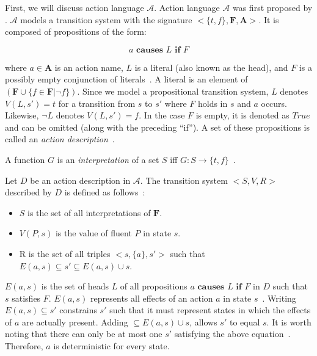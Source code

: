 First, we will discuss action language $ \mathcal{A} $.
Action language $ \mathcal{A} $ was first proposed by \citet{pednault_formulating_1987}.
$ \mathcal{A} $ models a transition system with the signature $ <\{t, f\}, \boldsymbol{F}, \boldsymbol{A}> $.
It is composed of propositions of the form:

$$
a \textbf{ causes } L \textbf{ if } F
$$

\noindent
where $ a \in \boldsymbol{A} $ is an action name, $ L $ is a literal (also known as the head), and $ F $ is a possibly empty conjunction of literals~\citep{gelfond_action_1998}.
A literal is an element of $(\boldsymbol{F} \cup \{f \in \boldsymbol{F} | \neg f\})$.
Since we model a propositional transition system, $L$ denotes $V(L, s') = t$ for a transition from $s$ to $s'$ where $F$ holds in $s$ and $a$ occurs.
Likewise, $\neg L$ denotes $V(L, s')=f$.
In the case $ F $ is empty, it is denoted as $ True $ and can be omitted (along with the preceding ``if'').
A set of these propositions is called an \textit{action description}~\citep{gelfond_action_1998}.

\begin{definition}
    A function $G$ is an \textit{interpretation} of a set $S$ iff $G: S \rightarrow \{t, f\}$~\citep{gelfond_action_1998}.
\end{definition}

\begin{definition}
    Let $ D $ be an action description in $ \mathcal{A} $.
    The transition system $ <S, V, R> $ described by $ D $ is defined as follows~\citep{gelfond_action_1998}:

    \begin{itemize}
        \item $ S $ is the set of all interpretations of $ \boldsymbol{F} $.
        \item $ V(P, s) $ is the value of fluent $P$ in state $s$.
        \item R is the set of all triples $ <s, \{a\}, s'> $ such that $ E(a,s) \subseteq s' \subseteq E(a,s) \cup s $.
    \end{itemize}
\end{definition}

$ E(a, s) $ is the set of heads $ L $ of all propositions $ a \textbf{ causes } L \textbf{ if } F $ in $ D $ such that $ s $ satisfies $ F $.
$ E(a, s) $ represents all effects of an action $ a $ in state $ s $~\citep{gelfond_action_1998}.
Writing $ E\left(a,s\right)\subseteq s' $ constrains $ s' $ such that it must represent states in which the effects of $ a $ are actually present.
Adding $ \subseteq E\left(a,s\right)\cup s $, allows $ s' $ to equal $ s $.
It is worth noting that there can only be at most one $ s' $ satisfying the above equation~\citep{gelfond_action_1998}.
Therefore, $ a $ is deterministic for every state.

